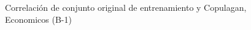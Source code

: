 \begin{figure}[H]
    \centering
    
    \caption{Correlación de conjunto original de entrenamiento y Copulagan, Economicos (B-1)}
    \label{pairwise-economicos-b-1-copulagan}
\end{figure}